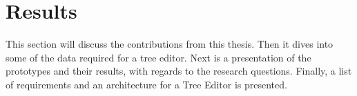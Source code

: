 \chapter{Results}

This section will discuss the contributions from this thesis.
Then it dives into some of the data required for a tree editor.
Next is a presentation of the prototypes and their results, with regards to the research questions.
Finally, a list of requirements and an architecture for a Tree Editor is presented.







